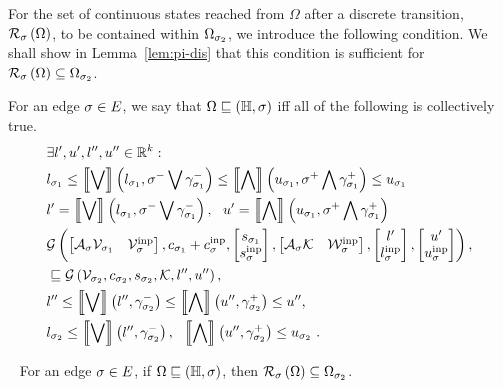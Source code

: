 %
For the set of continuous states reached from $\Omega$ after a
discrete transition, $\mathcal{R}_{\sigma}\left(\Omega\right)$, to be contained
within 
$\Omega_{\sigma_2}$, we introduce the following condition.  We shall
show in Lemma~\ref{lem:pi-dis} that this condition is sufficient for
$\mathcal{R}_{\sigma}\left(\Omega\right)\subseteq\Omega_{\sigma_2}$.
%
\begin{definition}
For an edge $\sigma\in E$, we say that $\Omega\sqsubseteq\left(\mathbb{H},\sigma\right)$
iff all of the following is collectively true.
%
\begin{align}
& \exists l^\prime,u^\prime,l^{\prime\prime},u^{\prime\prime}\in\mathbb{R}^k:\nonumber\\
& l_{\sigma_1}\leq \left\llbracket\bigvee\right\rrbracket\left(l_{\sigma_1},\sigma^-\bigvee \gamma_{\sigma_1}^-\right)\leq
\left\llbracket\bigwedge\right\rrbracket\left(u_{\sigma_1},\sigma^+\bigwedge \gamma_{\sigma_1}^+\right)\leq u_{\sigma_1}~\label{eqn:disinv1}\\
&
l^\prime=\left\llbracket\bigvee\right\rrbracket\left(l_{\sigma_1},\sigma^-\bigvee \gamma_{\sigma_1}^-\right),~~
u^\prime=\left\llbracket\bigwedge\right\rrbracket\left(u_{\sigma_1},\sigma^+\bigwedge \gamma_{\sigma_1}^+\right)~\label{eqn:disinv2}\\
& \mathcal{G}\left(
\left[\begin{matrix}\mathcal{A}_{\sigma}\mathcal{V}_{\sigma_1} & \mathcal{V}^{\operatorname{inp}}_{\sigma}\end{matrix}\right]
,
c_{\sigma_1}+c^{\operatorname{inp}}_{\sigma}
,
\left[\begin{matrix}s_{\sigma_1}\\ s^{\operatorname{inp}}_{\sigma}\end{matrix}\right]
,
\left[\begin{matrix}\mathcal{A}_{\sigma}\mathcal{K} & \mathcal{W}^{\operatorname{inp}}_{\sigma}\end{matrix}\right]
,
\left[\begin{matrix}l^\prime\\l^{\operatorname{inp}}_{\sigma}\end{matrix}\right]
,
\left[\begin{matrix}u^\prime\\ u^{\operatorname{inp}}_{\sigma}\end{matrix}\right]
\right),\nonumber\\
& \sqsubseteq 
\mathcal{G}\left(\mathcal{V}_{\sigma_2},c_{\sigma_2},s_{\sigma_2},\mathcal{K},l^{\prime\prime},u^{\prime\prime}\right),~\label{eqn:disinv3}\\
&
l^{\prime\prime}\leq\left\llbracket\bigvee\right\rrbracket\left(l^{\prime\prime},\gamma_{\sigma_2}^-\right)\leq\left\llbracket\bigwedge\right\rrbracket\left(u^{\prime\prime},\gamma_{\sigma_2}^+\right)\leq
u^{\prime\prime},~\label{eqn:disinv4}\\
& l_{\sigma_2}\leq\left\llbracket\bigvee\right\rrbracket\left(l^{\prime\prime},\gamma_{\sigma_2}^-\right),~~\left\llbracket\bigwedge\right\rrbracket\left(u^{\prime\prime},\gamma_{\sigma_2}^+\right)\leq u_{\sigma_2}~\label{eqn:disinv5}.
\end{align}
%
\end{definition}
%
\begin{lemma}~\label{lem:pi-dis}
For an edge $\sigma\in E$, if $\Omega\sqsubseteq\left(\mathbb{H},\sigma\right)$, then $\mathcal{R}_{\sigma}\left(\Omega\right)\subseteq\Omega_{\sigma_2}$.
\end{lemma}
%
